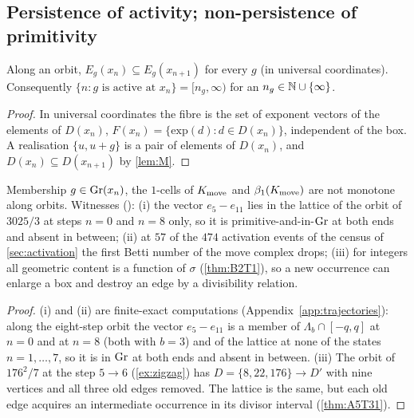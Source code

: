 \subsection{Persistence of activity; non-persistence of primitivity}
\begin{proposition}\label{prop:A4T4a}
Along an orbit, $E_g(x_n)\subseteq E_g(x_{n+1})$ for every $g$ (in universal coordinates). Consequently $\{n:g\text{ is active at }x_n\}=[n_g,\infty)$ for an $n_g\in\mathbb N\cup\{\infty\}$.
\end{proposition}
\begin{proof}
In universal coordinates the fibre is the set of exponent vectors of the elements of $D(x_n)$, $F(x_n)=\{\mathrm{exp}(d):d\in D(x_n)\}$, independent of the box. A realisation $\{u,u+g\}$ is a pair of elements of $D(x_n)$, and $D(x_n)\subseteq D(x_{n+1})$ by \cref{lem:M}. \qedhere
\end{proof}
\begin{proposition}\label{prop:A4T4b}
Membership $g\in\mathrm{Gr}(x_n)$, the $1$-cells of $K_{\mathrm{move}}$ and $\beta_1(K_{\mathrm{move}})$ are not monotone along orbits. Witnesses (): (i) the vector $e_5-e_{11}$ lies in the lattice of the orbit of $3025/3$ at steps $n=0$ and $n=8$ only, so it is primitive-and-in-$\mathrm{Gr}$ at both ends and absent in between; (ii) at $57$ of the $474$ activation events of the census of \cref{sec:activation} the first Betti number of the move complex drops; (iii) for integers all geometric content is a function of $\sigma$ (\cref{thm:B2T1}), so a new occurrence can enlarge a box and destroy an edge by a divisibility relation.
\end{proposition}
\begin{proof}
(i) and (ii) are finite-exact computations (Appendix~\ref{app:trajectories}): along the eight-step orbit the vector $e_5-e_{11}$ is a member of $\Lambda_b\cap[-q,q]$ at $n=0$ and at $n=8$ (both with $b=3$) and of the lattice at none of the states $n=1,\dots,7$, so it is in $\mathrm{Gr}$ at both ends and absent in between. (iii) The orbit of $176^2/7$ at the step $5\to6$ (\cref{ex:zigzag}) has $D=\{8,22,176\}\to D'$ with nine vertices and all three old edges removed. The lattice is the same, but each old edge acquires an intermediate occurrence in its divisor interval (\cref{thm:A5T31}). \qedhere
\end{proof}
